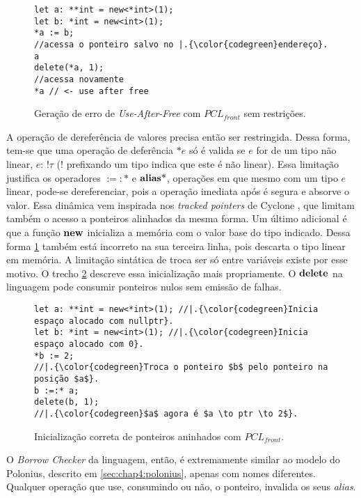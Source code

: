 \begin{figure}[ht]
	\caption{Geração de erro de \emph{Use-After-Free} com $PCL_{front}$ sem restrições.}
	\label{fig:pcl-front:uaf}
	\begin{lstlisting}[language=PCLfront]
let a: **int = new<*int>(1);
let b: *int = new<int>(1);
*a := b;
//acessa o ponteiro salvo no |.{\color{codegreen}endereço}. a
delete(*a, 1);
//acessa novamente
*a // <- use after free
	\end{lstlisting}
\end{figure}

A operação de dereferência de valores precisa então ser restringida. Dessa forma, tem-se que uma operação de deferência $\text{*}\!e$ só é valida se $e$ for de um tipo não linear, $e\!:\,!\tau$ ($!$ prefixando um tipo indica que este é não linear). Essa limitação justifica os operadores $:=:\!\!\text{*}$ e $\mathbf{alias}\text{*}$, operações em que mesmo com um tipo $e$ linear, pode-se dereferenciar, pois a operação imediata após é segura e absorve o valor. Essa dinâmica vem inspirada nos \emph{tracked pointers} de Cyclone \cite[p.6]{CYCLONEMEM}, que limitam também o acesso a ponteiros alinhados da mesma forma. Um último adicional é que a função $\mathbf{new}$ inicializa a memória com o valor base do tipo indicado. Dessa forma \ref{fig:pcl-front:uaf} também está incorreto na sua terceira linha, pois descarta o tipo linear em memória. A limitação sintática de troca ser só entre variáveis existe por esse motivo. O trecho \ref{fig:pcl-front:init} descreve essa inicialização mais propriamente. O $\mathbf{delete}$ na linguagem pode consumir ponteiros nulos sem emissão de falhas.

\begin{figure}[ht]
	\caption{Inicialização correta de ponteiros aninhados com $PCL_{front}$.}
	\label{fig:pcl-front:init}
	\begin{lstlisting}[language=PCLfront]
let a: **int = new<*int>(1); //|.{\color{codegreen}Inicia espaço alocado com nullptr}.
let b: *int = new<int>(1); //|.{\color{codegreen}Inicia espaço alocado com 0}.
*b := 2;
//|.{\color{codegreen}Troca o ponteiro $b$ pelo ponteiro na posição $a$}. 
b :=:* a;
delete(b, 1);
//|.{\color{codegreen}$a$ agora é $a \to ptr \to 2$}. 
	\end{lstlisting}
\end{figure}

O \emph{Borrow Checker} da linguagem, então, é extremamente similar ao modelo do Polonius, descrito em \ref{sec:chap4:polonius}, apenas com nomes diferentes. Qualquer operação que use, consumindo ou não, o ponteiro, invalida os seus \emph{alias}.
